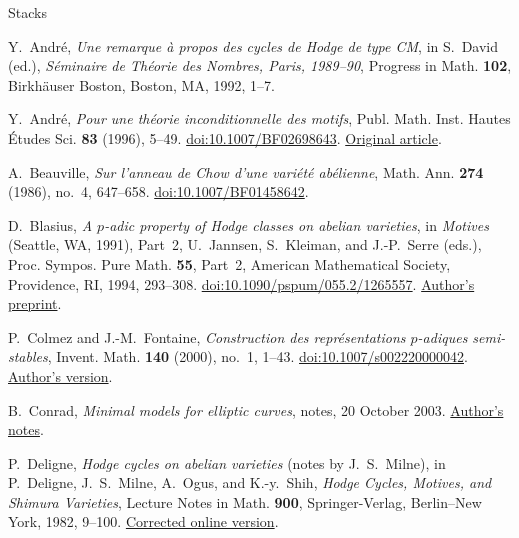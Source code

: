 \begin{thebibliography}{Stacks}

Y.~Andr\'e,
\emph{Une remarque \`a propos des cycles de Hodge de type CM},
in S.~David (ed.), \emph{S\'eminaire de Th\'eorie des Nombres,
Paris, 1989--90}, Progress in Math. \textbf{102},
Birkh\"auser Boston, Boston, MA, 1992, 1--7.

Y.~Andr\'e,
\emph{Pour une th\'eorie inconditionnelle des motifs},
Publ. Math. Inst. Hautes \'{E}tudes Sci. \textbf{83} (1996), 5--49.
\href{https://doi.org/10.1007/BF02698643}{doi:10.1007/BF02698643}.
\href{https://www.numdam.org/item/10.1007/BF02698643.pdf}{Original article}.

A.~Beauville,
\emph{Sur l'anneau de Chow d'une vari\'et\'e ab\'elienne},
Math. Ann. \textbf{274} (1986), no.~4, 647--658.
\href{https://doi.org/10.1007/BF01458642}{doi:10.1007/BF01458642}.

D.~Blasius,
\emph{A $p$-adic property of Hodge classes on abelian varieties},
in \emph{Motives} (Seattle, WA, 1991), Part~2,
U.~Jannsen, S.~Kleiman, and J.-P.~Serre (eds.),
Proc. Sympos. Pure Math. \textbf{55}, Part~2,
American Mathematical Society, Providence, RI, 1994, 293--308.
\href{https://doi.org/10.1090/pspum/055.2/1265557}{doi:10.1090/pspum/055.2/1265557}.
\href{https://archive.mpim-bonn.mpg.de/id/eprint/3859/1/preprint_1992_59.pdf}{Author's preprint}.

P.~Colmez and J.-M.~Fontaine,
\emph{Construction des repr\'esentations $p$-adiques semi-stables},
Invent. Math. \textbf{140} (2000), no.~1, 1--43.
\href{https://doi.org/10.1007/s002220000042}{doi:10.1007/s002220000042}.
\href{https://www.imo.universite-paris-saclay.fr/~fontaine/CF.pdf}{Author's version}.

B.~Conrad,
\emph{Minimal models for elliptic curves}, notes, 20 October 2003.
\href{https://math.stanford.edu/~conrad/vigregroup/vigre03/minimalmodel.pdf}{Author's notes}.

P.~Deligne,
\emph{Hodge cycles on abelian varieties} (notes by J.~S.~Milne),
in P.~Deligne, J.~S.~Milne, A.~Ogus, and K.-y.~Shih,
\emph{Hodge Cycles, Motives, and Shimura Varieties},
Lecture Notes in Math. \textbf{900}, Springer-Verlag,
Berlin--New York, 1982, 9--100.
\href{https://www.jmilne.org/math/Documents/Deligne82.pdf}{Corrected online version}.


\end{thebibliography}
